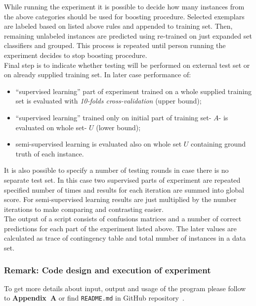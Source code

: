 \documentclass[12pt, a4paper, pdflatex]{report}
\begin{document}
While running the experiment it is possible to decide how many instances from the above categories should be used for boosting procedure. Selected exemplars are labeled based on listed above rules and appended to training set. Then, remaining unlabeled instances are predicted using re-trained on just expanded set classifiers and grouped. This process is repeated until person running the experiment decides to stop boosting procedure.\\

Final step is to indicate whether testing will be performed on external test set or on already supplied training set. 
In later case performance of:
\begin{itemize}
\item ``supervised learning'' part of experiment trained on a whole supplied training set is evaluated with \emph{10-folds cross-validation} (upper bound);
\item ``supervised learning'' trained only on initial part of training set- $A$- is evaluated on whole set- $U$ (lower bound);
\item semi-supervised learning is evaluated also on whole set $U$ containing ground truth of each instance.
\end{itemize}

It is also possible to specify a number of testing rounds in case there is no separate test set. In this case two supervised parts of experiment are repeated specified number of times and results for each iteration are summed into global score. For semi-supervised learning results are just multiplied by the number iterations to make comparing and contrasting easier.\\

The output of a script consists of confusions matrices and a number of correct predictions for each part of the experiment listed above. The later values are calculated as trace of contingency table and total number of instances in a data set.

\subsubsection{Remark: Code design and execution of experiment}
To get more details about input, output and usage of the program please follow to \textbf{Appendix~A} or find \texttt{README.md} in GitHub repository~\cite{githubcode}.
\end{document}
